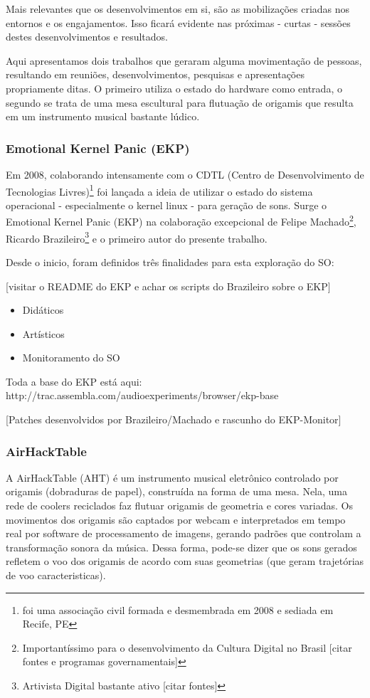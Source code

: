 Mais relevantes que os desenvolvimentos em si, são as mobilizações
criadas nos entornos e os engajamentos. Isso ficará evidente nas
próximas - curtas - sessões destes desenvolvimentos e resultados.

Aqui apresentamos dois trabalhos que geraram alguma movimentação de
pessoas, resultando em reuniões, desenvolvimentos, pesquisas e
apresentações propriamente ditas. O primeiro utiliza o estado do
hardware como entrada, o segundo se trata de uma mesa escultural para
flutuação de origamis que resulta em um instrumento musical bastante
lúdico.


\subsubsection{Emotional Kernel Panic (EKP)}

Em 2008, colaborando intensamente com o CDTL (Centro de
Desenvolvimento de Tecnologias Livres)\footnote{foi uma associação
  civil formada e desmembrada em 2008 e sediada em Recife, PE} foi
lançada a ideia de utilizar o estado do sistema operacional -
especialmente o kernel linux - para geração de sons. Surge o Emotional
Kernel Panic (EKP) na colaboração excepcional de Felipe
Machado\footnote{Importantíssimo para o desenvolvimento da Cultura
  Digital no Brasil [citar fontes e programas governamentais]},
Ricardo Brazileiro\footnote{Artivista Digital bastante ativo [citar
    fontes]} e o primeiro autor do presente trabalho.

Desde o inicio, foram definidos três finalidades para esta exploração
do SO:

[visitar o README do EKP e achar os scripts do Brazileiro sobre o EKP]

\begin{itemize}
\item Didáticos
\item Artísticos
\item Monitoramento do SO
\end{itemize}

Toda a base do EKP está aqui: http://trac.assembla.com/audioexperiments/browser/ekp-base

[Patches desenvolvidos por Brazileiro/Machado e rascunho do EKP-Monitor]

\subsubsection{AirHackTable}

A AirHackTable (AHT) é um instrumento musical eletrônico controlado por
origamis (dobraduras de papel), construída na forma de uma mesa. Nela,
uma rede de coolers reciclados faz flutuar origamis de geometria e
cores variadas. Os movimentos dos origamis são captados por webcam e
interpretados em tempo real por software de processamento de imagens,
gerando padrões que controlam a transformação sonora da música. Dessa
forma, pode-se dizer que os sons gerados refletem o voo dos origamis
de acordo com suas geometrias (que geram trajetórias de voo
caracteristicas).

